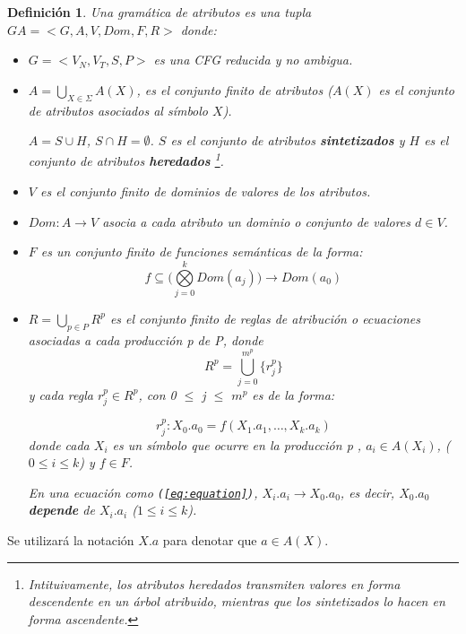 \documentclass[a4paper]{article}
\newtheorem{definition}{Definición}[section]
\begin{document}
\begin{definition}
\label{def:grammarattr}
Una gramática de atributos es una tupla \mbox{$GA=<G,A,V,Dom,F,R>$} donde:
\begin{itemize}
\item $G=<V_N,V_T,S,P>$ es una CFG reducida y no ambigua.
\item $A = \bigcup_{X \in \Sigma} A(X)$, es el conjunto finito de atributos ($A(X)$ es el conjunto de atributos asociados al símbolo $X$).

$A=S \cup H$, $S \cap H = \emptyset$. $S$ es el conjunto de atributos \textbf{sintetizados} y
$H$ es el conjunto de atributos \textbf{heredados}%
\footnote{Intituivamente, los atributos heredados transmiten valores en forma descendente
en un árbol atribuido, mientras que los sintetizados lo hacen en forma ascendente.}.
\item $V$ es el conjunto finito de dominios de valores de los atributos.
\item $Dom:A \rightarrow V$ asocia a cada atributo un dominio o conjunto de valores $d \in V$.
\item $F$ es un conjunto finito de funciones semánticas de la forma:
\begin{equation}
f \subseteq (\bigotimes\limits_{j=0}^{k}{ Dom(a_{j} ))\rightarrow Dom(a_{0})}
\end{equation}
 
\item $R = \bigcup _{p \in P} R^{p}$ es el conjunto finito de reglas de atribución o ecuaciones asociadas a cada producción p de P, donde
\begin{equation}
R^{p} = \bigcup\limits_{j=0}^{m^{p}}{\{r_{j}^{p}\}}
\end{equation}
y cada regla $r_{j}^{p} \in R^{p}$, con 0 $\leq$ j $\leq$ $m^{p}$ es de la forma:

\begin{equation}
\label{eq:equation}
r_{j}^{p}: X_{0}.a_{0} = f(X_{1}.a_{1} ,\dots , X_{k}.a_{k})
\end{equation} 
donde cada $X_i$ es un símbolo que ocurre en la producción \textit{p} , $a_i \in A(X_i)$, 
($0 \leqslant i \leqslant k$) y $f \in F$.

En una ecuación como \texttt{(\ref{eq:equation})}, $X_{i}.a_{i} \rightarrow X_{0}.a_{0}$, es decir, $X_0.a_0$ \textbf{depende} de $X_{i}.a_{i}$ ($1 \leq i \leq k$).
\end{itemize}
\end{definition}

Se utilizará la notación $X.a$ para denotar que $a \in A(X)$.
\end{document}
